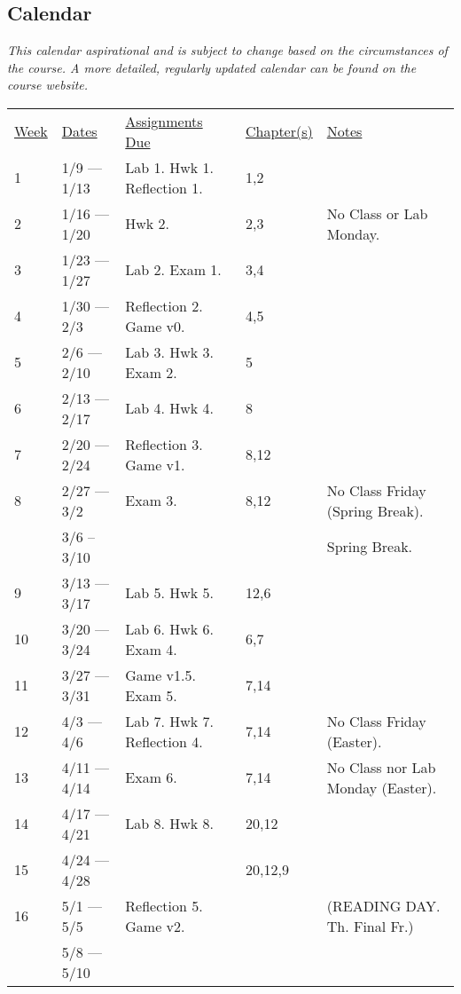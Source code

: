 \documentclass[10pt]{article}
\begin{document}
\subsection{Calendar}

\textit{This calendar aspirational and is subject to change based on the circumstances of the course. A more detailed, regularly updated calendar can be found on the course website. }

\begin{center}
\begin{tabular}{lllll}
\underline{Week} & \underline{Dates} & \underline{Assignments Due} & \underline{Chapter(s)} & \underline{Notes} \\
1 & 1/9 --- 1/13  & Lab 1. Hwk 1. Reflection 1. &  1,2 & \\
2 & 1/16 --- 1/20 & Hwk 2. & 2,3 & No Class or Lab Monday. \\
3 & 1/23 --- 1/27 & Lab 2. Exam 1. &  3,4 &  \\
4 & 1/30 --- 2/3  & Reflection 2. Game v0.  &  4,5 & \\
5 & 2/6 --- 2/10 & Lab 3. Hwk 3. Exam 2. & 5  & \\
6 & 2/13 --- 2/17 & Lab 4. Hwk 4. & 8 & \\
7 & 2/20 --- 2/24 & Reflection 3. Game v1.&  8,12 & \\
8 & 2/27 --- 3/2 & Exam 3. & 8,12 & No Class Friday (Spring Break).  \\
  &  3/6 -- 3/10 & & & Spring Break. \\
9 & 3/13 --- 3/17  & Lab 5. Hwk 5. & 12,6 &  \\
10 & 3/20 --- 3/24  & Lab 6. Hwk 6. Exam 4. & 6,7 & \\
11 & 3/27 --- 3/31 & Game v1.5. Exam 5. & 7,14  & \\
12 & 4/3 --- 4/6 & Lab 7. Hwk 7. Reflection 4. & 7,14 & No Class Friday (Easter).  \\
13 & 4/11 --- 4/14 & Exam 6. & 7,14  & No Class nor Lab Monday (Easter). \\
14 & 4/17 --- 4/21 & Lab 8. Hwk 8. & 20,12 & \\
15 & 4/24 --- 4/28 &   &  20,12,9 & \\
16 & 5/1 --- 5/5 & Reflection 5. Game v2. & & (READING DAY. Th. Final Fr.) \\
   & 5/8 --- 5/10 &
\end{tabular}
\end{center}
\end{document}
